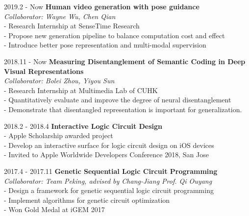 \documentclass{academiccv}
\begin{document}
\begin{tablist}

\item[2019.2 - Now] 	\tab \textbf {Human video generation with pose guidance} \textbf
					\\ \tab \emph{Collaborator: Wayne Wu, Chen Qian}\emph
				    \\ \tab - Research Internship at SenseTime Research
				     \\ \tab - Propose new generation pipeline to balance computation cost and effect
				     \\ \tab - Introduce better pose representation and multi-modal supervision	

\item[2018.11 - Now] 	\tab \textbf {Measuring Disentanglement of Semantic Coding in Deep Visual Representations} \textbf
					\\ \tab \emph{Collaborator: Bolei Zhou, Yiyou Sun}\emph
					\\ \tab - Research Internship at Multimedia Lab of CUHK
				      \\ \tab - Quantitatively evaluate and improve the degree of neural disentanglement
				      \\ \tab - Demonstrate that disentangled representation is important for generalization.
				   			     
				     
\item[2018.2 - 2018.4] 	\tab \textbf {Interactive Logic Circuit Design} \textbf
					\\ \tab - Apple Scholarship awarded project
				    \\ \tab - Develop an interactive surface for logic circuit design on iOS devices
				    \\ \tab - Invited to Apple Worldwide Developers Conference 2018, San Jose

\item[2017.4 - 2017.11] 	\tab \textbf {Genetic Sequential Logic Circuit Programming} \textbf
					\\ \tab \emph{Collaborator: Team Peking, advised by Chang-Jiang Prof. Qi Ouyang}\emph
					\\ \tab - Design a framework for genetic sequential logic circuit programming
				    \\ \tab - Implement algorithms for genetic circuit optimization
				    \\ \tab - Won Gold Medal at iGEM 2017		    
				     				     			     				      
\end{tablist}
\end{document}
